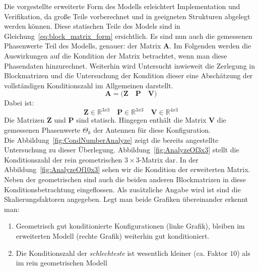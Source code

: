 Die vorgestellte erweiterte Form des Modells erleichtert Implementation und Verifikation, da große Teile vorberechnet und in geeigneten Strukturen abgelegt werden können. Diese statischen Teile des Models sind in Gleichung~\ref{eq:block_matrix_form} ersichtlich. Es sind nun auch die gemessenen Phasenwerte Teil des Modells, genauer: der Matrix $\mathbf{A}$. Im Folgenden werden die Auswirkungen auf die Kondition der Matrix betrachtet, wenn man diese Phasendaten hinzurechnet. Weiterhin wird Untersucht inwieweit die Zerlegung in Blockmatrizen und die Untersuchung der Kondition dieser eine Abschätzung der vollständigen Konditionszahl im Allgemeinen darstellt. 
%
\begin{equation}
\label{eq:block_matrix_form}
\mathbf{A}=\bigg( \mathbf{Z}\quad \mathbf{P}\quad \mathbf{V}\bigg)
\end{equation}
%
Dabei ist:
\begin{equation}
\mathbf{Z} \in \mathbb{R}^{3x3} \quad \mathbf{P} \in \mathbb{R}^{3x3} \quad \mathbf{V}\in \mathbb{R}^{4x3}
\end{equation}
%
Die Matrizen $\mathbf{Z}$ und $\mathbf{P}$ sind statisch. Hingegen enthält die Matrix $\mathbf{V}$ die gemessenen Phasenwerte $\Theta_k$ der Antennen für diese Konfiguration. \\
%
Die Abbildung~\ref{fig:CondNumberAnalyze} zeigt die bereits angestellte Untersuchung zu dieser Überlegung. Abbildung~\ref{fig:AnalyzeOf3x3} stellt die Konditionszahl der rein geometrischen $3\times3$-Matrix dar. In der Abbildung~\ref{fig:AnalyzeOf10x3} sehen wir die Kondition der erweiterten Matrix. Neben der geometrischen sind auch die beiden anderen Blockmatrizen in diese Konditionsbetrachtung eingeflossen. Als zusätzliche Angabe wird ist sind die Skalierungsfaktoren angegeben. Legt man beide Grafiken übereinander erkennt man:
\begin{enumerate}
\item Geometrisch gut konditionierte Konfigurationen (linke Grafik), bleiben im erweiterten Modell (rechte Grafik) weiterhin gut konditioniert.
\item Die Konditionszahl der \textit{schlechteste} ist wesentlich kleiner (ca. Faktor $10$) als im rein geometrischen Modell
\end{enumerate}
%
